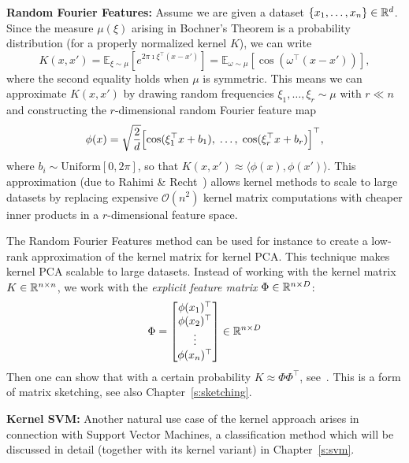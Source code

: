 \medskip
\noindent
\textbf{Random Fourier Features:} 
Assume we are given a  dataset $\{x_1, \dots , x_n\} \in \mathbb{R}^d$.
Since the measure $\mu(\xi)$ arising in Bochner's Theorem is a probability distribution (for a properly normalized kernel $K$), we can write
\begin{equation*}
    K(x, x') = \mathbb{E}_{\xi \sim \mu}\!\left[e^{2\pi \imath \xi^\top(x - x')}\right]
    = \mathbb{E}_{\omega \sim \mu}\!\left[\cos\!\left(\omega^\top(x - x')\right)\right],
\end{equation*}
where the second equality holds when $\mu$ is symmetric. This means we can approximate $K(x, x')$ by drawing random frequencies $\xi_1, \dots, \xi_r \sim \mu$ with $r \ll n$ and constructing the $r$-dimensional random Fourier feature map
\begin{equation*}
    \phi(x) = \sqrt{\frac{2}{d}}\Bigl[\cos(\xi_1^\top x + b_1),\; \dots,\; \cos(\xi_r^\top x + b_r)\Bigr]^\top,
\end{equation*}
where $b_i \sim \text{Uniform}[0, 2\pi]$, so that $K(x, x') \approx \langle \phi(x), \phi(x') \rangle$. This approximation (due to Rahimi \& Recht~\cite{rahimi2007random}) allows kernel methods to scale to large datasets by replacing expensive $\mathcal{O}(n^2)$ kernel matrix computations with cheaper inner products in a $r$-dimensional feature space.

The Random Fourier Features method can be used for instance to create a low-rank approximation of the kernel matrix for kernel PCA. This technique makes kernel PCA scalable to large datasets. Instead of working with the kernel matrix $K \in \mathbb{R}^{n \times n}$, we work 
with the \emph{explicit feature matrix} $\Phi \in \mathbb{R}^{n \times D}$:
\begin{equation}\label{eq:feature_matrix}
  \Phi = \begin{bmatrix}
    \phi(x_1)^\top\\
    \phi(x_2)^\top\\
    \vdots\\
    \phi(x_n)^\top
  \end{bmatrix} \in \mathbb{R}^{n \times D}
\end{equation}
Then one can show that with a certain probability $K \approx \Phi\Phi^\top$, see~\cite{rahimi2007random}. This is a form of matrix sketching, see also Chapter~\ref{s:sketching}.





\smallskip
\noindent
\textbf{Kernel SVM:}
Another natural use case of the kernel approach arises in connection with Support Vector Machines, a classification method which will be discussed in detail (together with its kernel variant) in Chapter~\ref{s:svm}.



